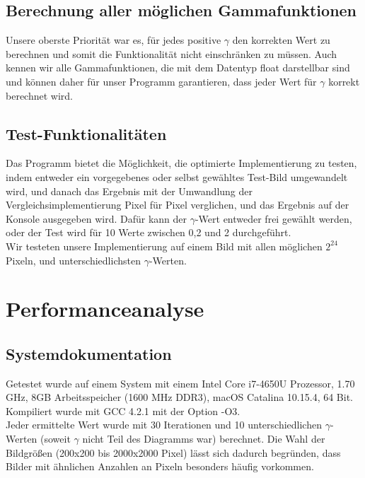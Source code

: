 \documentclass[course=erap]{aspdoc}
\begin{document}
	\subsection{Berechnung aller möglichen Gammafunktionen}
	Unsere oberste Priorität war es, für jedes positive $\gamma$ den korrekten Wert zu berechnen und somit die Funktionalität nicht  einschränken zu müssen. Auch kennen wir alle Gammafunktionen, die mit dem Datentyp float darstellbar sind und können daher für unser Programm garantieren, dass jeder Wert für $\gamma$ korrekt berechnet wird.

	\subsection{Test-Funktionalitäten}
	Das Programm bietet die Möglichkeit, die optimierte Implementierung zu testen, indem entweder ein vorgegebenes oder selbst gewähltes Test-Bild umgewandelt wird, und danach das Ergebnis mit der Umwandlung der Vergleichsimplementierung Pixel für Pixel verglichen, und das Ergebnis auf der Konsole ausgegeben wird. Dafür kann der $\gamma$-Wert entweder frei gewählt werden, oder der Test wird für 10 Werte zwischen 0,2 und 2 durchgeführt.\\
	Wir testeten unsere Implementierung auf einem Bild mit allen möglichen $2^{24}$ Pixeln, und unterschiedlichsten $\gamma$-Werten.

	\section{Performanceanalyse}
	\subsection{Systemdokumentation}
	Getestet wurde auf einem System mit einem Intel Core i7-4650U Prozessor, 1.70 GHz, 8GB Arbeitsspeicher (1600 MHz DDR3), macOS Catalina 10.15.4, 64 Bit.
    Kompiliert wurde mit GCC 4.2.1 mit der Option -O3.\\
    Jeder ermittelte Wert wurde mit 30 Iterationen und 10 unterschiedlichen $\gamma$-Werten (soweit $\gamma$ nicht Teil des Diagramms war) berechnet. Die Wahl der Bildgrößen (200x200 bis 2000x2000 Pixel) lässt sich dadurch begründen, dass Bilder mit ähnlichen Anzahlen an Pixeln besonders häufig vorkommen.
\end{document}
